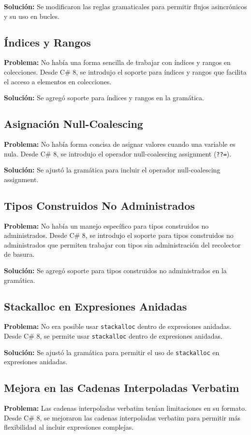 \textbf{Solución:} Se modificaron las reglas gramaticales para permitir flujos asincrónicos y su uso en bucles.

\subsection*{Índices y Rangos}
\textbf{Problema:} No había una forma sencilla de trabajar con índices y rangos en colecciones. Desde C\# 8, se introdujo el soporte para índices y rangos que facilita el acceso a elementos en colecciones.

\textbf{Solución:} Se agregó soporte para índices y rangos en la gramática.

\subsection*{Asignación Null-Coalescing}
\textbf{Problema:} No había forma concisa de asignar valores cuando una variable es nula. Desde C\# 8, se introdujo el operador null-coalescing assignment (\texttt{??=}).

\textbf{Solución:} Se ajustó la gramática para incluir el operador null-coalescing assignment.

\subsection*{Tipos Construidos No Administrados}
\textbf{Problema:} No había un manejo específico para tipos construidos no administrados. Desde C\# 8, se introdujo el soporte para tipos construidos no administrados que permiten trabajar con tipos sin administración del recolector de basura.

\textbf{Solución:} Se agregó soporte para tipos construidos no administrados en la gramática.

\subsection*{Stackalloc en Expresiones Anidadas}
\textbf{Problema:} No era posible usar \texttt{stackalloc} dentro de expresiones anidadas. Desde C\# 8, se permite usar \texttt{stackalloc} dentro de expresiones anidadas.

\textbf{Solución:} Se ajustó la gramática para permitir el uso de \texttt{stackalloc} en expresiones anidadas.

\subsection*{Mejora en las Cadenas Interpoladas Verbatim}
\textbf{Problema:} Las cadenas interpoladas verbatim tenían limitaciones en su formato. Desde C\# 8, se mejoraron las cadenas interpoladas verbatim para permitir más flexibilidad al incluir expresiones complejas.

